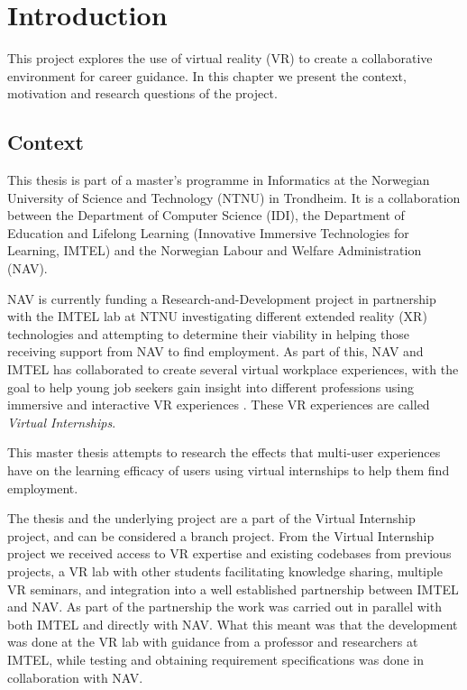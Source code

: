 
\chapter{Introduction}
\label{chapter:1}
This project explores the use of virtual reality (VR) to create a collaborative environment for career guidance. In this chapter we present the context, motivation and research questions of the project. 

\section{Context}
\label{section:context}
This thesis is part of a master's programme in Informatics at the Norwegian University of Science and Technology (NTNU) in Trondheim. It is a collaboration between the Department of Computer Science (IDI), the Department of Education and Lifelong Learning (Innovative Immersive Technologies for Learning, IMTEL) and the Norwegian Labour and Welfare Administration (NAV). 

NAV is currently funding a Research-and-Development project in partnership with the IMTEL lab at NTNU investigating different extended reality (XR) technologies and attempting to determine their viability in helping those receiving support from NAV to find employment. As part of this, NAV and IMTEL has collaborated to create several virtual workplace experiences, with the goal to help young job seekers gain insight into different professions using immersive and interactive VR experiences \cite{IMTELinternships}. These VR experiences are called \textit{Virtual Internships}. 

This master thesis attempts to research the effects that multi-user experiences have on the learning efficacy of users using virtual internships to help them find employment.

The thesis and the underlying project are a part of the Virtual Internship project, and can be considered a branch project. From the Virtual Internship project we received access to VR expertise and existing codebases from previous projects, a VR lab with other students facilitating knowledge sharing, multiple VR seminars, and integration into a well established partnership between IMTEL and NAV.    
As part of the partnership the work was carried out in parallel with both IMTEL and directly with NAV. What this meant was that the development was done at the VR lab with guidance from a professor and researchers at IMTEL, while testing and obtaining requirement specifications was done in collaboration with NAV.    


